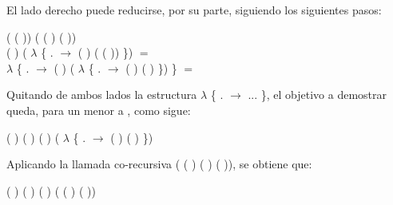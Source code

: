 \begin{AgdaAlign}
El lado derecho puede reducirse, por su parte, siguiendo los siguientes pasos:
\begin{flushright}
(  ( )) \AgdaFunction{+} ( ( ) ( )) \\
( ) \AgdaFunction{+} ( $\lambda$ \{ . $\rightarrow$  ( ) ( ( )) \}) $=$ \\
 $\lambda$ \{ . $\rightarrow$ ( ) \AgdaFunction{+} ( $\lambda$ \{ . $\rightarrow$  ( ) ( ) \}) \} $=$
\end{flushright}

Quitando de ambos lados la estructura  $\lambda$ \{ . $\rightarrow$ ... \}, el objetivo a demostrar queda, para un  menor a , como sigue:
\begin{center}
\AgdaFunction{[}  \AgdaFunction{]}  ( ) (  \AgdaFunction{+}  ) \AgdaFunction{$\leq$} ( ) \AgdaFunction{+} ( $\lambda$ \{ . $\rightarrow$  ( ) ( ) \})
\end{center}

Aplicando la llamada co-recursiva (  ( ) ( ) ( )), se obtiene que:
\begin{center}
\AgdaFunction{[}  \AgdaFunction{]}  ( ) (  \AgdaFunction{+}  ) \AgdaFunction{$\leq$} ( ) \AgdaFunction{+} ( ( ) ( ))
\end{center}


\end{AgdaAlign}

